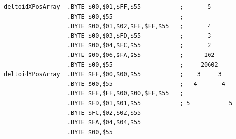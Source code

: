 \begin{lstlisting}
deltoidXPosArray  .BYTE $00,$01,$FF,$55           ;       5      
                  .BYTE $00,$55                   ;              
                  .BYTE $00,$01,$02,$FE,$FF,$55   ;       4      
                  .BYTE $00,$03,$FD,$55           ;       3      
                  .BYTE $00,$04,$FC,$55           ;       2      
                  .BYTE $00,$06,$FA,$55           ;      202     
                  .BYTE $00,$55                   ;     20602    
deltoidYPosArray  .BYTE $FF,$00,$00,$55           ;    3     3   
                  .BYTE $00,$55                   ;   4       4  
                  .BYTE $FE,$FF,$00,$00,$FF,$55   ;              
                  .BYTE $FD,$01,$01,$55           ; 5           5
                  .BYTE $FC,$02,$02,$55
                  .BYTE $FA,$04,$04,$55
                  .BYTE $00,$55
\end{lstlisting}


